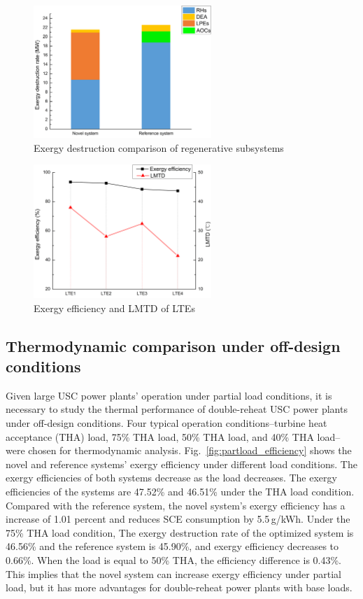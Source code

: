 \documentclass[preprint,12pt]{elsarticle}
\begin{document}
\begin{figure}[htbp]
\centering
\includegraphics[width=0.6\textwidth]{fig/regenerative_subsys_compare.png}
\caption{Exergy destruction comparison of regenerative subsystems} 
\label{fig:regenerative_subsys_compare}
\end{figure}



\begin{figure}[htbp]
\centering
\includegraphics[width=0.6\textwidth]{fig/LPE_exergy_LMTD.png}
\caption{Exergy efficiency and LMTD of LTEs} 
\label{fig:LPE_exergy_LMDT}
\end{figure}


\subsection{Thermodynamic comparison under off-design conditions}
\label{ssub:offdesing_compare}
Given large USC power plants' operation under partial load conditions, it is necessary to study the thermal performance of double-reheat USC power plants under off-design conditions.
Four typical operation conditions--turbine heat acceptance (THA) load, 75\% THA load, 50\% THA load, and 40\% THA load--were chosen for thermodynamic analysis. 
Fig.~\ref{fig:partload_efficiency} shows the novel and reference systems' exergy efficiency under different load conditions. The exergy efficiencies of both systems decrease as the load decreases.
The exergy efficiencies of the systems are 47.52\% and 46.51\% under the THA load condition. Compared with the reference system, the novel system's exergy efficiency has a increase of 1.01 percent and reduces SCE consumption by 5.5\,g/kWh. 
Under the 75\% THA load condition, The exergy destruction rate of the optimized system is 46.56\% and the reference system is 45.90\%, and exergy efficiency decreases to 0.66\%. 
When the load is equal to 50\% THA, the efficiency difference is 0.43\%.
This implies that the novel system can increase exergy efficiency under partial load, but it has more advantages for double-reheat power plants with base loads.
\end{document}
